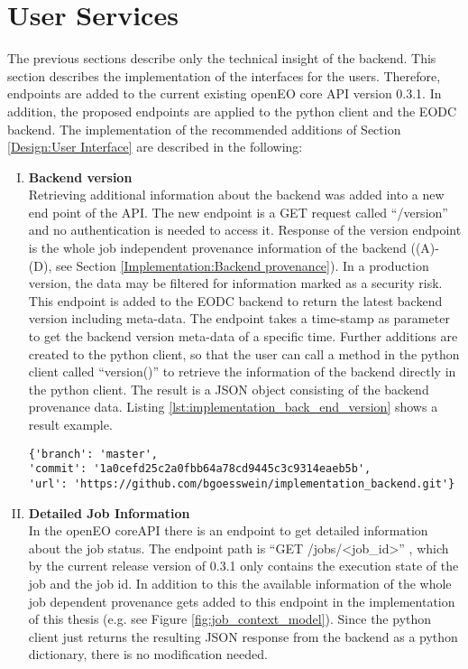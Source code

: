 \documentclass[draft,final]{vutinfth} %
\begin{document}
\section{User Services}\label{Implementation:User Interface}
The previous sections describe only the technical insight of the backend. This section describes the implementation of the interfaces for the users. Therefore, endpoints are added to the current existing openEO core API version 0.3.1. In addition, the proposed endpoints are applied to the python client and the EODC backend. The implementation of the recommended additions of Section \ref{Design:User Interface} are described in the following:
\begin{enumerate}[I.]
\item \textbf{Backend version} \\
	Retrieving additional information about the backend was added into a new end point of the API. The new endpoint is a GET request called “/version” and no authentication is needed to access it. Response of the version endpoint is the whole job independent provenance information of the backend ((A)-(D), see Section \ref{Implementation:Backend provenance}). In a production version, the data may be filtered for information marked as a security risk. This endpoint is added to the EODC backend to return the latest backend version including meta-data. The endpoint takes a time-stamp as parameter to get the backend version meta-data of a specific time. Further additions are created to the python client, so that the user can call a method in the python client called “version()” to retrieve the information of the backend directly in the python client. The result is a JSON object consisting of the backend provenance data. Listing \ref{lst:implementation_back_end_version} shows a result example.

\begin{listing}[ht]
	\begin{verbatim}
{'branch': 'master',
'commit': '1a0cefd25c2a0fbb64a78cd9445c3c9314eaeb5b',
'url': 'https://github.com/bgoesswein/implementation_backend.git'}
	\end{verbatim}
	\caption{Backend version example.}
	\label{lst:implementation_back_end_version}
\end{listing}

\item \textbf{Detailed Job Information} \\
	In the openEO coreAPI there is an endpoint to get detailed information about the job status. The endpoint path is “GET /jobs/<job\_id>” , which by the current release version of 0.3.1 only contains the execution state of the job and the job id. In addition to this the available information of the whole job dependent provenance gets added to this endpoint in the implementation of this thesis (e.g. see Figure \ref{fig:job_context_model}). Since the python client just returns the resulting JSON response from the backend as a python dictionary, there is no modification needed.


\end{enumerate}
\end{document}
